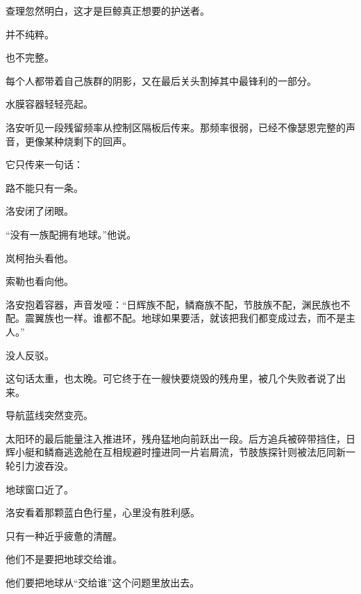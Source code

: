 查理忽然明白，这才是巨鲸真正想要的护送者。

并不纯粹。

也不完整。

每个人都带着自己族群的阴影，又在最后关头割掉其中最锋利的一部分。

水膜容器轻轻亮起。

洛安听见一段残留频率从控制区隔板后传来。那频率很弱，已经不像瑟恩完整的声音，更像某种烧剩下的回声。

它只传来一句话：

路不能只有一条。

洛安闭了闭眼。

“没有一族配拥有地球。”他说。

岚柯抬头看他。

索勒也看向他。

洛安抱着容器，声音发哑：“日辉族不配，鳞裔族不配，节肢族不配，渊民族也不配。震翼族也一样。谁都不配。地球如果要活，就该把我们都变成过去，而不是主人。”

没人反驳。

这句话太重，也太晚。可它终于在一艘快要烧毁的残舟里，被几个失败者说了出来。

导航蓝线突然变亮。

太阳环的最后能量注入推进环，残舟猛地向前跃出一段。后方追兵被碎带挡住，日辉小艇和鳞裔逃逸舱在互相规避时撞进同一片岩屑流，节肢族探针则被法厄同新一轮引力波吞没。

地球窗口近了。

洛安看着那颗蓝白色行星，心里没有胜利感。

只有一种近乎疲惫的清醒。

他们不是要把地球交给谁。

他们要把地球从“交给谁”这个问题里放出去。
